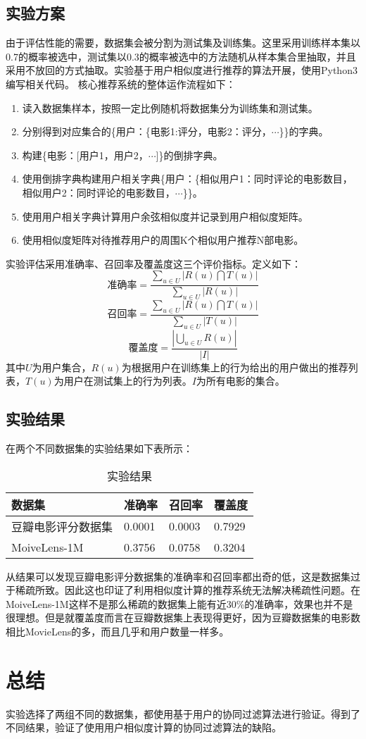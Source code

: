 \documentclass[12pt,a4paper]{ctexart}
\begin{document}
\subsection{实验方案}
由于评估性能的需要，数据集会被分割为测试集及训练集。这里采用训练样本集以0.7的概率被选中，测试集以0.3的概率被选中的方法随机从样本集合里抽取，并且采用不放回的方式抽取。实验基于用户相似度进行推荐的算法开展，使用Python3编写相关代码。
核心推荐系统的整体运作流程如下：
\begin{enumerate}
	\item 读入数据集样本，按照一定比例随机将数据集分为训练集和测试集。
	\item 分别得到对应集合的\{用户：\{电影1:评分，电影2：评分，$\cdots$\}\}的字典。
	\item 构建\{电影：[用户1，用户2，$\cdots$]\}的倒排字典。
	\item 使用倒排字典构建用户相关字典\{用户：\{相似用户1：同时评论的电影数目，相似用户2：同时评论的电影数目，$\cdots$\}\}。
	\item 使用用户相关字典计算用户余弦相似度并记录到用户相似度矩阵。
	\item 使用相似度矩阵对待推荐用户的周围K个相似用户推荐N部电影。
		
\end{enumerate}


实验评估采用准确率、召回率及覆盖度这三个评价指标。定义如下：
\[ \mbox{准确率}=\frac{\sum_{u \in U}|R(u) \bigcap T(u)|}{\sum_{u \in U}|R(u)|} \]
\[ \mbox{召回率}=\frac{\sum_{u \in U}|R(u) \bigcap T(u)|}{\sum_{u \in U}|T(u)|} \]
\[ \mbox{覆盖度}=\frac{\left|\bigcup_{u \in U} R(u)\right|}{|I|} \]
其中$U$为用户集合，$R(u)$为根据用户在训练集上的行为给出的用户做出的推荐列表，$T(u)$为用户在测试集上的行为列表。$I$为所有电影的集合。
\subsection{实验结果}
在两个不同数据集的实验结果如下表所示：
\begin{table}[H]
		\centering
	\begin{tabular}{@{}llll@{}}
		\toprule
		数据集          & 准确率    & 召回率    & 覆盖度    \\ \midrule
		豆瓣电影评分数据集    & 0.0001 & 0.0003 & 0.7929 \\
		MoiveLens-1M & 0.3756 & 0.0758 & 0.3204 \\ \bottomrule
	\end{tabular}
	\caption{实验结果}
\label{table:exp_result}
\end{table}
从结果可以发现豆瓣电影评分数据集的准确率和召回率都出奇的低，这是数据集过于稀疏所致。因此这也印证了利用相似度计算的推荐系统无法解决稀疏性问题。在MoiveLens-1M这样不是那么稀疏的数据集上能有近30\%的准确率，效果也并不是很理想。但是就覆盖度而言在豆瓣数据集上表现得更好，因为豆瓣数据集的电影数相比MovieLens的多，而且几乎和用户数量一样多。




\section{总结}
实验选择了两组不同的数据集，都使用基于用户的协同过滤算法进行验证。得到了不同结果，验证了使用用户相似度计算的协同过滤算法的缺陷。


\printbibliography[heading=bibliography,title=参考文献]
\end{document}
